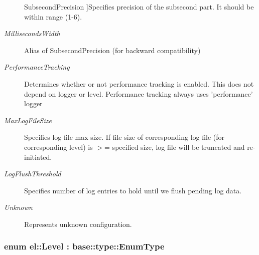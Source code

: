 \begin{Desc}
\begin{description}
{\hypertarget{namespaceel_a281f5db6d6163678bc68a8b23b59e124a945b6ef21f66457079a6ab7b6c3459f9}{Subsecond\-Precision}\label{namespaceel_a281f5db6d6163678bc68a8b23b59e124a945b6ef21f66457079a6ab7b6c3459f9}
}]Specifies precision of the subsecond part. It should be within range (1-\/6). \item[{\em 
\hypertarget{namespaceel_a281f5db6d6163678bc68a8b23b59e124a052bf0f0c813b3c41c5b5046ebc26529}{Milliseconds\-Width}\label{namespaceel_a281f5db6d6163678bc68a8b23b59e124a052bf0f0c813b3c41c5b5046ebc26529}
}]Alias of Subsecond\-Precision (for backward compatibility) \item[{\em 
\hypertarget{namespaceel_a281f5db6d6163678bc68a8b23b59e124abe9e43d200c5698cb8519daed7035874}{Performance\-Tracking}\label{namespaceel_a281f5db6d6163678bc68a8b23b59e124abe9e43d200c5698cb8519daed7035874}
}]Determines whether or not performance tracking is enabled. This does not depend on logger or level. Performance tracking always uses 'performance' logger \item[{\em 
\hypertarget{namespaceel_a281f5db6d6163678bc68a8b23b59e124a4b35e615142d60db6383426f051e700b}{Max\-Log\-File\-Size}\label{namespaceel_a281f5db6d6163678bc68a8b23b59e124a4b35e615142d60db6383426f051e700b}
}]Specifies log file max size. If file size of corresponding log file (for corresponding level) is $>$= specified size, log file will be truncated and re-\/initiated. \item[{\em 
\hypertarget{namespaceel_a281f5db6d6163678bc68a8b23b59e124ac1b4aae5c168e64292c9aa87a124ae86}{Log\-Flush\-Threshold}\label{namespaceel_a281f5db6d6163678bc68a8b23b59e124ac1b4aae5c168e64292c9aa87a124ae86}
}]Specifies number of log entries to hold until we flush pending log data. \item[{\em 
\hypertarget{namespaceel_a281f5db6d6163678bc68a8b23b59e124a88183b946cc5f0e8c96b2e66e1c74a7e}{Unknown}\label{namespaceel_a281f5db6d6163678bc68a8b23b59e124a88183b946cc5f0e8c96b2e66e1c74a7e}
}]Represents unknown configuration. \end{description}
\end{Desc}
\hypertarget{namespaceel_ab0ac6091262344c52dd2d3ad099e8e36}{
\subsubsection[{Level}]{\setlength{\rightskip}{0pt plus 5cm}enum {\bf el\-::\-Level} \-: base\-::type\-::\-Enum\-Type\hspace{0.3cm}{\ttfamily [strong]}}}\label{namespaceel_ab0ac6091262344c52dd2d3ad099e8e36}


